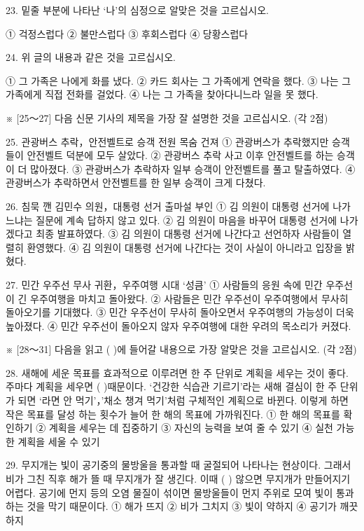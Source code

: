 \documentclass[12pt]{article}
\begin{document}
\begin{enumerate}[1.]
23. 밑줄 부분에 나타난 ‘나’의 심정으로 알맞은 것을 고르십시오.

① 걱정스럽다
② 불만스럽다
③ 후회스럽다
④ 당황스럽다


24. 위 글의 내용과 같은 것을 고르십시오.

① 그 가족은 나에게 화를 냈다.
② 카드 회사는 그 가족에게 연락을 했다.
③ 나는 그 가족에게 직접 전화를 걸었다.
④ 나는 그 가족을 찾아다니느라 일을 못 했다.




※ [25～27] 다음 신문 기사의 제목을 가장 잘 설명한 것을 고르십시오. (각 2점)

25.
관광버스 추락，안전벨트로 승객 전원 목숨 건져
① 관광버스가 추락했지만 승객들이 안전벨트 덕분에 모두 살았다.
② 관광버스 추락 사고 이후 안전벨트를 하는 승객이 더 많아졌다.
③ 관광버스가 추락하자 일부 승객이 안전벨트를 풀고 탈출하였다.
④ 관광버스가 추락하면서 안전벨트를 한 일부 승객이 크게 다쳤다.


26.
침묵 깬 김민수 의원，대통령 선거 출마설 부인
① 김 의원이 대통령 선거에 나가느냐는 질문에 계속 답하지 않고 있다.
② 김 의원이 마음을 바꾸어 대통령 선거에 나가겠다고 최종 발표하였다.
③ 김 의원이 대통령 선거에 나간다고 선언하자 사람들이 열렬히 환영했다.
④ 김 의원이 대통령 선거에 나간다는 것이 사실이 아니라고 입장을 밝혔다.


27.
민간 우주선 무사 귀환，우주여행 시대 ‘성큼’
① 사람들의 응원 속에 민간 우주선이 긴 우주여행을 마치고 돌아왔다.
② 사람들은 민간 우주선이 우주여행에서 무사히 돌아오기를 기대했다.
③ 민간 우주선이 무사히 돌아오면서 우주여행의 가능성이 더욱 높아졌다.
④ 민간 우주선이 돌아오지 않자 우주여행에 대한 우려의 목소리가 커졌다.




※ [28～31] 다음을 읽고 (   )에 들어갈 내용으로 가장 알맞은 것을 고르십시오. (각 2점)

28.
  새해에 세운 목표를 효과적으로 이루려면 한 주 단위로 계획을 세우는
것이 좋다. 주마다 계획을 세우면 (     )때문이다. ‘건강한
식습관 기르기’라는 새해 결심이 한 주 단위가 되면 ‘라면 안 먹기’，'채소
챙겨 먹기’처럼 구체적인 계획으로 바뀐다. 이렇게 하면 작은 목표를 달성
하는 횟수가 늘어 한 해의 목표에 가까워진다.
① 한 해의 목표를 확인하기
② 계획을 세우는 데 집중하기
③ 자신의 능력을 보여 줄 수 있기
④ 실천 가능한 계획을 세울 수 있기


29.
  무지개는 빛이 공기중의 물방울을 통과할 때 굴절되어 나타나는
현상이다. 그래서 비가 그친 직후 해가 뜰 때 무지개가 잘 생긴다. 이때
(      ) 않으면 무지개가 만들어지기 어렵다. 공기에 먼지 등의
오염 물질이 섞이면 물방울들이 먼지 주위로 모여 빛이 통과하는 것을
막기 때문이다.
① 해가 뜨지
② 비가 그치지
③ 빛이 약하지
④ 공기가 깨끗하지



\end{enumerate}
\end{document}
